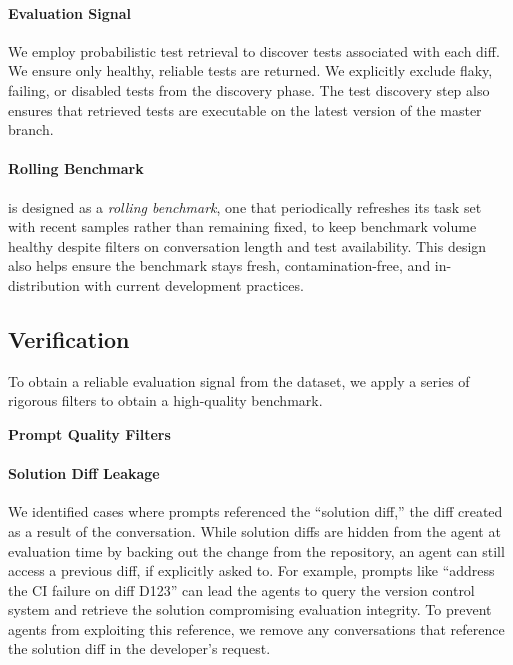 \paragraph{Evaluation Signal}

We employ probabilistic test retrieval to discover tests associated with each diff. We ensure only healthy, reliable tests are returned.
We explicitly exclude flaky, failing, or disabled tests from the discovery phase. The test discovery step also ensures that retrieved tests are executable on the latest version of the master branch.

\paragraph{Rolling Benchmark}

\benchmark{} is designed as a \emph{rolling benchmark}, one that periodically refreshes its task set with recent samples rather than remaining fixed, to keep benchmark volume healthy despite filters on conversation length and test availability. This design also helps ensure the benchmark stays fresh, contamination-free, and in-distribution with current development practices.


\subsection{Verification}
\label{subsec:verification}

To obtain a reliable evaluation signal from the dataset, we apply a series of rigorous filters to obtain a high-quality benchmark.

\vspace{1em}
\textbf{Prompt Quality Filters}


\paragraph{Solution Diff Leakage}
We identified cases where prompts referenced the ``solution diff,'' the diff created as a result of the conversation. While solution diffs are hidden from the agent at evaluation time by backing out the change from the repository, an agent can still access a previous diff, if explicitly asked to. For example, prompts like ``address the CI failure on diff D123'' can lead the agents to query the version control system and retrieve the solution compromising evaluation integrity. To prevent agents from exploiting this reference, we remove any conversations that reference the solution diff in the developer's request.

